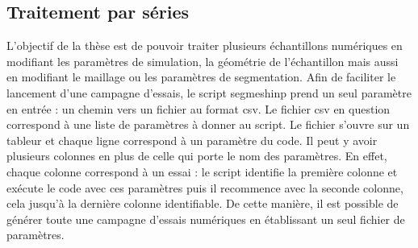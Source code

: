 	\subsection{Traitement par séries}
		L'objectif de la thèse est de pouvoir traiter plusieurs échantillons numériques en modifiant les paramètres de simulation, la géométrie de l'échantillon mais aussi en modifiant le maillage ou les paramètres de segmentation. Afin de faciliter le lancement d'une campagne d'essais, le script segmeshinp prend un seul paramètre en entrée : un chemin vers un fichier au format csv. Le fichier csv en question correspond à une liste de paramètres à donner au script. Le fichier s'ouvre sur un tableur et chaque ligne correspond à un paramètre du code. Il peut y avoir plusieurs colonnes en plus de celle qui porte le nom des paramètres. En effet, chaque colonne correspond à un essai : le script identifie la première colonne et exécute le code avec ces paramètres puis il recommence avec la seconde colonne, cela jusqu'à la dernière colonne identifiable. De cette manière, il est possible de générer toute une campagne d'essais numériques en établissant un seul fichier de paramètres.